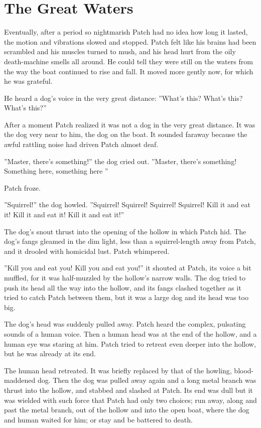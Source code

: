 \documentclass[12pt]{book}
\begin{document}

\section{The Great Waters}

Eventually, after a period so nightmarish Patch had no idea how long it lasted, the motion and vibrations slowed and stopped. Patch felt like his brains had been scrambled and his muscles turned to mush, and his head hurt from the oily death-machine smells all around. He could tell they were still on the waters from the way the boat continued to rise and fall. It moved more gently now, for which he was grateful.

He heard a dog's voice in the very great distance: ''What's this? What's this? What's this?''

After a moment Patch realized it was not a dog in the very great distance. It was the dog very near to him, the dog on the boat. It sounded faraway because the awful rattling noise had driven Patch almost deaf.

''Master, there's something!'' the dog cried out. ''Master, there's something! Something here, something here %
''

Patch froze.

''Squirrel!'' the dog howled. ''Squirrel! Squirrel! Squirrel! Squirrel! Kill it and eat it! Kill it and eat it! Kill it and eat it!''

The dog's snout thrust into the opening of the hollow in which Patch hid. The dog's fangs gleamed in the dim light, less than a squirrel-length away from Patch, and it drooled with homicidal lust. Patch whimpered.

''Kill you and eat you! Kill you and eat you!'' it shouted at Patch, its voice a bit muffled, for it was half-muzzled by the hollow's narrow walls. The dog tried to push its head all the way into the hollow, and its fangs clashed together as it tried to catch Patch between them, but it was a large dog and its head was too big.

The dog's head was suddenly pulled away. Patch heard the complex, pulsating sounds of a human voice. Then a human head was at the end of the hollow, and a human eye was staring at him. Patch tried to retreat even deeper into the hollow, but he was already at its end.

The human head retreated. It was briefly replaced by that of the howling, blood-maddened dog. Then the dog was pulled away again %
and a long metal branch was thrust into the hollow, and stabbed and slashed at Patch. Its end was dull but it was wielded with such force that Patch had only two choices; run away, along and past the metal branch, out of the hollow and into the open boat, where the dog and human waited for him; or stay and be battered to death.
\end{document}
